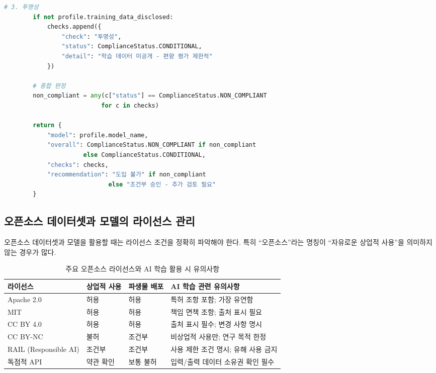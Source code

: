 \begin{lstlisting}[language=Python, caption={사전 학습 모델 거버넌스 평가 시스템}, label={lst:pretrained_governance}]
        # 3. 투명성
        if not profile.training_data_disclosed:
            checks.append({
                "check": "투명성",
                "status": ComplianceStatus.CONDITIONAL,
                "detail": "학습 데이터 미공개 - 편향 평가 제한적"
            })

        # 종합 판정
        non_compliant = any(c["status"] == ComplianceStatus.NON_COMPLIANT
                           for c in checks)

        return {
            "model": profile.model_name,
            "overall": ComplianceStatus.NON_COMPLIANT if non_compliant
                      else ComplianceStatus.CONDITIONAL,
            "checks": checks,
            "recommendation": "도입 불가" if non_compliant
                             else "조건부 승인 - 추가 검토 필요"
        }
\end{lstlisting}

\subsection{오픈소스 데이터셋과 모델의 라이선스 관리}
\label{sec:9.4.3}

오픈소스 데이터셋과 모델을 활용할 때는 라이선스 조건을 정확히 파악해야 한다. 특히 ``오픈소스''라는 명칭이 ``자유로운 상업적 사용''을 의미하지 않는 경우가 많다.

\begin{table}[htbp]
\centering
\caption{주요 오픈소스 라이선스와 AI 학습 활용 시 유의사항}
\label{tab:license_comparison}
\begin{tabularx}{\textwidth}{p{2.5cm}p{2cm}p{2cm}X}
\toprule
\textbf{라이선스} & \textbf{상업적 사용} & \textbf{파생물 배포} & \textbf{AI 학습 관련 유의사항} \\
\midrule
Apache 2.0 & 허용 & 허용 & 특허 조항 포함; 가장 유연함 \\
\midrule
MIT & 허용 & 허용 & 책임 면책 조항; 출처 표시 필요 \\
\midrule
CC BY 4.0 & 허용 & 허용 & 출처 표시 필수; 변경 사항 명시 \\
\midrule
CC BY-NC & 불허 & 조건부 & 비상업적 사용만; 연구 목적 한정 \\
\midrule
RAIL (Responsible AI) & 조건부 & 조건부 & 사용 제한 조건 명시; 유해 사용 금지 \\
\midrule
독점적 API & 약관 확인 & 보통 불허 & 입력/출력 데이터 소유권 확인 필수 \\
\bottomrule
\end{tabularx}
\end{table}


